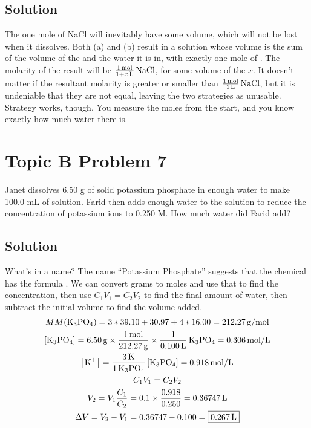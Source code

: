\documentclass[10pt]{article}
\begin{document}
        \subsection{Solution}
            The one mole of NaCl will inevitably have some volume, which will not be lost when it dissolves.
            Both (a) and (b) result in a solution whose volume is the sum of the volume of the  and the water it is in, with exactly one mole of .
            The molarity of the result will be $\frac{1\,\unit{\mole}}{1 + x\,\unit{\liter}}\,\ce{NaCl}$, for some volume of the  $x$.
            It doesn't matter if the resultant molarity is greater or smaller than $\frac{1\,\unit{\mole}}{1\,\unit{\liter}}\,\ce{NaCl}$, but it is undeniable that they are not equal, leaving the two strategies as unusable.
            Strategy  works, though. You measure the moles from the start, and you know exactly how much water there is.

    \pagebreak
    \section{Topic B Problem 7}
        Janet dissolves 6.50 g of solid potassium phosphate in enough water to make 100.0 mL of solution. 
        Farid then adds enough water to the solution to reduce the concentration of potassium ions to 0.250 M. 
        How much water did Farid add?

        \subsection{Solution}
            What's in a name? 
            The name ``Potassium Phosphate'' suggests that the chemical has the formula .
            We can convert grams to moles and use that to find the concentration, then use $C_1 V_1 = C_2 V_2$ to find the final amount of water, then subtract the initial volume to find the volume added.
            \begin{gather}
                MM(\ce{K3PO4})  =   3 * 39.10 + 30.97 + 4 * 16.00
                    =   212.27\,\unit{\gram/\mole}\\
                \left[ \ce{K3PO4} \right]   =   6.50\,\unit{\gram}  \times  \frac{1\,\unit{\mole}}{212.27\,\unit{\gram}}
                                                                    \times  \frac{1}{0.100\,\unit{\liter}}  \,\ce{K3PO4}
                    =   0.306\,\unit{\mole/\liter}\\
                \left[ \ce{K+} \right]  =   \frac{3\,\ce{K}}{1\,\ce{K3PO4}} \left[ \ce{K3PO4} \right]
                    =   0.918\,\unit{\mole/\liter}\\
                C_1 V_1 =   C_2 V_2\\
                V_2 =   V_1 \frac{C_1}{C_2}
                    =   0.1 \times \frac{0.918}{0.250}
                    =   0.36747\,\unit{\liter}\\
                \Delta V    =   V_2 - V_1
                    =   0.36747 - 0.100
                    =   \boxed{0.267\,\unit{\liter}}
            \end{gather}
\end{document}
